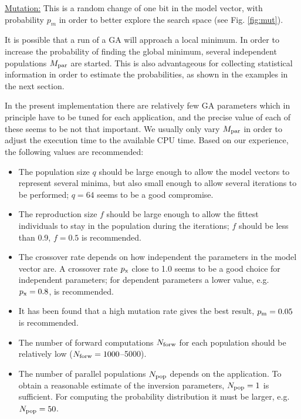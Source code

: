 \documentclass{saclantc}
\begin{document}
\underline{Mutation:} This is a random change of one bit in the model
vector, with probability $p_m$ in order to better explore the search
space (see Fig. \ref{fig:mut}).
\vspace{0.1in}

It is possible that a run of a GA will approach a local minimum. In
order to increase the probability of finding the global minimum,
several independent populations $ M_{\rm par}$ are started.  This is
also advantageous for collecting statistical information in order to estimate
the probabilities, as shown in the examples in the next section.


In the present implementation there are relatively few GA parameters
which in principle have to be tuned for each application, and the
precise value of each of these seems to be not that important. We
usually only vary $M_{\rm par} $ in order to adjust the execution time
to the available CPU time. Based on our experience, the
following values are recommended:
\begin{itemize}
\item The population size $ q$ should be large enough to allow
the model vectors to represent several minima, but also small
enough  to allow several iterations to be performed; $q=64 $ seems to be a
good compromise.
\item The reproduction size $f$ should be large enough to allow the
fittest individuals to stay in the population during the iterations; $f$
should be less than 0.9,  $f=0.5$ is recommended.
\item The crossover rate depends on how independent the parameters in
the model vector are. A crossover rate $ p_{\rm x}$ close to 1.0 seems
to be a good choice for independent parameters; for dependent
parameters a lower value, e.g. $ p_{\rm x}=0.8$, is recommended.
\item It has been found that a high mutation rate gives the best
result, $ p_{\rm m}=0.05$ is recommended.
\item The number of forward computations $N_{\rm forw}$ for each population should be
relatively low ($N_{\rm forw}=1000$--5000).
\item The number of parallel populations $N_{\rm pop}$ depends on the
application.  To obtain a reasonable estimate of the inversion
parameters, $N_{\rm pop} = 1$ is sufficient. For computing the
probability distribution it must be larger, e.g.\ $N_{\rm pop} = 50$.
\end{itemize}
\end{document}
